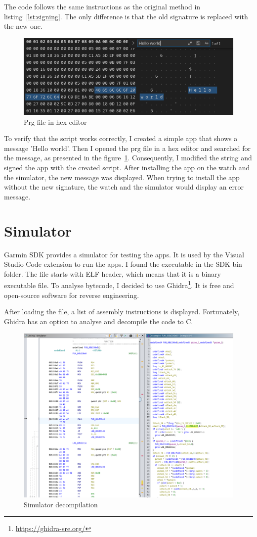 The code follows the same instructions as the original method in listing~\ref{lst:signing}.
The only difference is that the old signature is replaced with the new one.

\begin{figure}[h]
    \centering
    \includegraphics[width=0.7\linewidth]{../../images/app-hex-editor-hello-world}
    \caption{Prg file in hex editor}
    \label{fig:hello-world}
\end{figure}

To verify that the script works correctly, I created a simple app that shows a message 'Hello world'.
Then I opened the prg file in a hex editor and searched for the message, as presented in the figure~\ref{fig:hello-world}.
Consequently, I modified the string and signed the app with the created script.
After installing the app on the watch and the simulator, the new message was displayed.
When trying to install the app without the new signature, the watch and the simulator would display an error message.

\section{Simulator}
Garmin SDK provides a simulator for testing the apps.
It is used by the Visual Studio Code extension to run the apps.
I found the executable in the SDK bin folder.
The file starts with ELF header, which means that it is a binary executable file.
To analyse bytecode, I decided to use Ghidra\footnote{\url{https://ghidra-sre.org/}}.
It is free and open-source software for reverse engineering.

After loading the file, a list of assembly instructions is displayed.
Fortunately, Ghidra has an option to analyse and decompile the code to C\@.

\begin{figure}[h]
    \centering
    \includegraphics[width=0.7\linewidth]{../../images/ghidra}
    \caption{Simulator decompilation}
    \label{fig:concept}
\end{figure}

